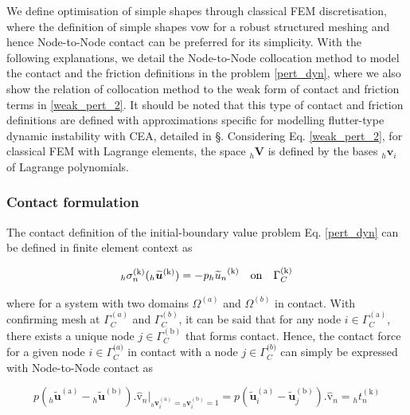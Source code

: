 We define optimisation of simple shapes through classical FEM discretisation, where the definition of simple shapes vow for a robust structured meshing and hence Node-to-Node contact can be preferred for its simplicity.
With the following explanations, we detail the Node-to-Node collocation method to model the contact and the friction definitions in the problem \eqref{pert_dyn}, where we also show the relation of collocation method to the weak form of contact and friction terms in  \eqref{weak_pert_2}. 
It should be noted that this type of contact and friction definitions are defined with approximations specific for modelling flutter-type dynamic instability with CEA, detailed in {\color{red}\S}.
Considering Eq. \eqref{weak_pert_2}, for classical FEM with Lagrange elements, the space ${}_h \bm V$ is defined by the bases $ {}_h \bm v_i $ of Lagrange polynomials.  





\subsubsection{Contact formulation} \label{weak_pert_2}

The contact definition of the initial-boundary value problem Eq. \eqref{pert_dyn} can be defined in finite element context as

\begin{equation}
{}_h\sigma^{(\mathrm k)}_n({}_h\bm{\widetilde u}^\mathrm{(k)}) = - \mathit{p}{{}_h\widetilde{u}_n}^{(\mathrm k)} \quad \mathrm{on}\quad\Gamma^{\mathrm{(k)}}_C\\
\end{equation}

where for a system with two domains $\Omega^{(a)}$ and  $\Omega^{(b)}$ in contact. 
With confirming mesh at $\Gamma_C^{(a)}$ and $\Gamma_C^{(b)}$, it can be said that for any node ${i} \in \Gamma_C^{(\mathrm a)}$, there exists a unique node ${j} \in \Gamma_C^{(\mathrm b)}$ that forms contact. Hence, the contact force for a given node $i \in \Gamma_C^{\mathrm (a)}$ in contact with a node $j \in \Gamma_C^{\mathrm (b)}$ can simply be expressed with Node-to-Node contact as

\begin{equation}
  \mathit{p}({{}_h\widetilde{\bm u}}^{(\mathrm a)} - {{}_h \widetilde{\bm u}}^{ ( \mathrm b)}). \bm{\hat{\mathrm v}}_n\bigg|_{ {}_h \bm v_i^\mathrm{(a)}= {}_h \bm v_i^\mathrm{(b)}=1}  = p ( \widetilde{ \bm u}_{{i}}^{(\mathrm a)}- \widetilde{ \bm u}_{{j}}^{(\mathrm b)}). \bm{\hat{\mathrm v}}_n = {}_ht^{(\mathrm k)}_n
\end{equation}

